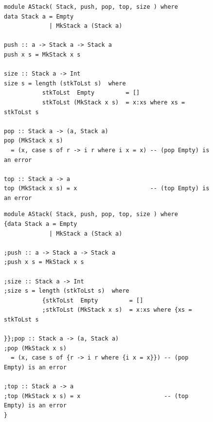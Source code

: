 \begin{figure}
\begin{outlineenv}\small
{\small\begin{verbatim}
module AStack( Stack, push, pop, top, size ) where
data Stack a = Empty 
             | MkStack a (Stack a)

push :: a -> Stack a -> Stack a
push x s = MkStack x s

size :: Stack a -> Int
size s = length (stkToLst s)  where
           stkToLst  Empty         = []
           stkToLst (MkStack x s)  = x:xs where xs = stkToLst s

pop :: Stack a -> (a, Stack a)
pop (MkStack x s)
  = (x, case s of r -> i r where i x = x) -- (pop Empty) is an error

top :: Stack a -> a
top (MkStack x s) = x                     -- (top Empty) is an error
\end{verbatim}}
\end{outlineenv}
\label{layout-before}
\begin{outlineenv}\small
{\small\begin{verbatim}
module AStack( Stack, push, pop, top, size ) where
{data Stack a = Empty 
             | MkStack a (Stack a)

;push :: a -> Stack a -> Stack a
;push x s = MkStack x s

;size :: Stack a -> Int
;size s = length (stkToLst s)  where
           {stkToLst  Empty         = []
           ;stkToLst (MkStack x s)  = x:xs where {xs = stkToLst s

}};pop :: Stack a -> (a, Stack a)
;pop (MkStack x s)
  = (x, case s of {r -> i r where {i x = x}}) -- (pop Empty) is an error

;top :: Stack a -> a
;top (MkStack x s) = x                        -- (top Empty) is an error
}
\end{verbatim}}
\end{outlineenv}
\label{layout-after}

\end{figure}




